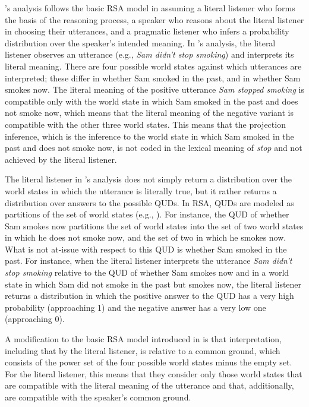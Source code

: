 \documentclass[11pt,fleqn]{article}
\newcommand{\6}{\mbox{$[\hspace*{-.6mm}[$}}
\newcommand{\9}{\mbox{$]\hspace*{-.6mm}]$}}
\newcommand{\citepos}[1]{\citeauthor{#1}'s \citeyear{#1}}
\begin{document}
\citepos{qing-etal2016} analysis follows the basic RSA model in assuming a literal listener who forms the basis of the reasoning process, a speaker who reasons about the literal listener in choosing their utterances, and a pragmatic listener who infers a probability distribution over the speaker's intended meaning.  In \citepos{qing-etal2016} analysis, the literal listener observes an utterance (e.g., {\em Sam didn't stop smoking}) and interprets its literal meaning. There are four possible world states against which utterances are interpreted; these differ in whether Sam smoked in the past, and in whether Sam smokes now. The literal meaning of the positive utterance {\em Sam stopped smoking} is compatible only with the world state in which Sam smoked in the past and does not smoke now, which means that the literal meaning of the negative variant is compatible with the other three world states. This means that the projection inference, which is the inference to the world state in which Sam smoked in the past and does not smoke now, is not coded in the lexical meaning of {\em stop} and not achieved by the literal listener.

The literal listener in \citepos{qing-etal2016} analysis does not simply return a distribution over the world states in which the utterance is literally true, but it rather returns a distribution over answers to the possible QUDs. In RSA, QUDs are modeled as partitions of the set of world states (e.g., \citealt{kao-etal2014}). For instance, the QUD of whether Sam smokes now partitions the set of world states into the set of two world states in which he does not smoke now, and the set of two in which he smokes now. What is not at-issue with respect to this QUD is whether Sam smoked in the past. For instance, when the literal listener interprets the utterance {\em Sam didn't stop smoking} relative to the QUD of whether Sam smokes now and in a world state in which Sam did not smoke in the past but smokes now, the literal listener returns a distribution in which the positive answer to the QUD has a very high probability (approaching 1) and the negative answer has a very low one (approaching 0). 

A modification to the basic RSA model introduced in \citealt{qing-etal2016} is that interpretation, including that by the literal listener, is relative to a common ground, which consists of the power set of the four possible world states minus the empty set. For the literal listener, this means that they consider only those world states that are compatible with the literal meaning of the utterance and that, additionally, are compatible with the speaker's common ground. 
\end{document}
